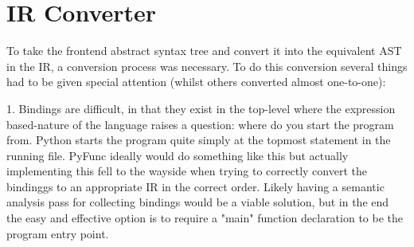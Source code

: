 \documentclass{l4proj}
\begin{document}











\section{IR Converter}

To take the frontend abstract syntax tree and convert it into the equivalent AST in the IR, a conversion process was necessary.
To do this conversion several things had to be given special attention (whilst others converted almost one-to-one):

1. Bindings are difficult, in that they exist in the top-level where the expression based-nature of the language raises a question: where do you start the program from.
Python starts the program quite simply at the topmost statement in the running file.
PyFunc ideally would do something like this but actually implementing this fell to the wayside when trying to correctly convert the bindinggs to an appropriate IR in the correct order.
Likely having a semantic analysis pass for collecting bindings would be a viable solution, but in the end the easy and effective option is to require a "main" function declaration to be the program entry point.
\end{document}
